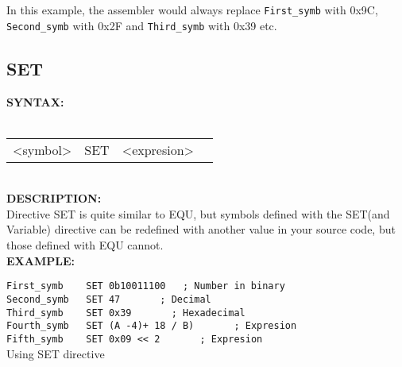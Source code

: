                 In this example, the assembler would always replace {\color{highlight_symbol}\verb'First_symb'} with 0x9C,
                {\color{highlight_symbol}\verb'Second_symb'} with 0x2F and {\color{highlight_symbol}\verb'Third_symb'} with 0x39 etc.

            \subsection{SET}
            \textbf{SYNTAX:}\\
                    \\ {
                            \texttt{}
                            \begin{tabular}[h!]{llll}
                            { \color{highlight_symbol} <symbol> }  &
                            { \color{highlight_directive} SET } &
                            { \color{highlight_constant} <expresion> } & { \color{highlight_comment}  }\\
                            \end{tabular}
                    }
                    \\

            \textbf{DESCRIPTION:}\\
            Directive SET is quite similar to EQU, but symbols defined with the SET(and Variable) directive can be redefined with another value in your source
            code, but those defined with EQU cannot.\\

            \textbf{EXAMPLE:}\\
                \begin{code}[h!]
                \mysmallfont{}
                            {\color{highlight_constant}\verb'First_symb'}\verb'    '{\color{highlight_directive}\verb'SET'}\verb' '{\color{highlight_bin}\verb'0b10011100'}\verb'   '{\color{highlight_comment}\verb'; Number in binary'}\\
                            {\color{highlight_constant}\verb'Second_symb'}\verb'   '{\color{highlight_directive}\verb'SET'}\verb' '{\color{highlight_oct}\verb'47'}\verb'       '{\color{highlight_comment}\verb'; Decimal'}\\
                            {\color{highlight_constant}\verb'Third_symb'}\verb'    '{\color{highlight_directive}\verb'SET'}\verb' '{\color{highlight_dec}\verb'0x39'}\verb'       '{\color{highlight_comment}\verb'; Hexadecimal'}\\
                            {\color{highlight_constant}\verb'Fourth_symb'}\verb'   '{\color{highlight_directive}\verb'SET'}\verb' '{\color{highlight_dec}\verb'(A -4)+ 18 / B)'}\verb'       '{\color{highlight_comment}\verb'; Expresion'}\\
                            {\color{highlight_constant}\verb'Fifth_symb'}\verb'    '{\color{highlight_directive}\verb'SET'}\verb' '{\color{highlight_dec}\verb'0x09 << 2'}\verb'       '{\color{highlight_comment}\verb'; Expresion'}\\
                \caption{Using SET directive}
                \end{code}

